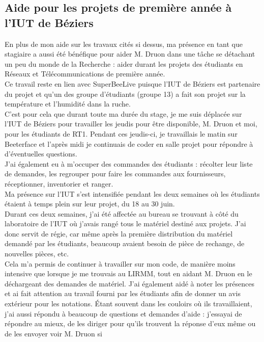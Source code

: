 \documentclass[11pt,french,a4paper]{report}
\begin{document}
        \subsection{Aide pour les projets de première année à l'IUT de Béziers}
En plus de mon aide sur les travaux cités si dessus, ma présence en tant que stagiaire a aussi été bénéfique pour aider M. Druon 
dans une tâche se détachant un peu du monde de la Recherche : aider durant les projets des étudiants en Réseaux et Télécommunications 
de première année. \\
Ce travail reste en lien avec SuperBeeLive puisque l'IUT de Béziers est partenaire du projet et qu'un des groupe d'étudiants (groupe 13) 
a fait son projet sur la température et l'humidité dans la ruche. \\
C'est pour cela que durant toute ma durée du stage, je me suis déplacée sur l'IUT de Béziers pour travailler les jeudis pour être
disponible, M. Druon et moi, pour les étudiants de RT1. Pendant ces jeudis-ci, je travaillais le matin sur Beeterface et 
l'après midi je continuais de coder en salle projet pour répondre à d'éventuelles questions. \\
J'ai également eu à m'occuper des commandes des étudiants : récolter leur liste de demandes, les regrouper pour faire les commandes
aux fournisseurs, réceptionner, inventorier et ranger. \\
Ma présence sur l'IUT s'est intensifiée pendant les deux semaines où les étudiants étaient à temps plein sur leur projet, du 18 au 30 juin. \\
Durant ces deux semaines, j'ai été affectée au bureau se trouvant à côté du laboratoire de l'IUT où j'avais rangé tous le matériel 
destiné aux projets.
J'ai donc servit de régie, car même après la première distribution du matériel demandé par les étudiants, beaucoup avaient 
besoin de pièce de rechange, de nouvelles pièces, etc. \\
Cela m'a permis de continuer à travailler sur mon code, de manière moins intensive que lorsque je me trouvais au LIRMM, tout en
aidant M. Druon en le déchargeant des demandes de matériel. 
J'ai également aidé à noter les présences et ai fait attention au travail fourni par les étudiants afin de donner un avis extérieur pour
les notations.
Étant souvent dans les couloirs où ils travaillaient, j'ai aussi répondu à beaucoup de questions et demandes d'aide : 
j'essayai de répondre au mieux, de les diriger pour qu'ils trouvent la réponse d'eux même ou de les envoyer voir M. Druon si 
\end{document}
